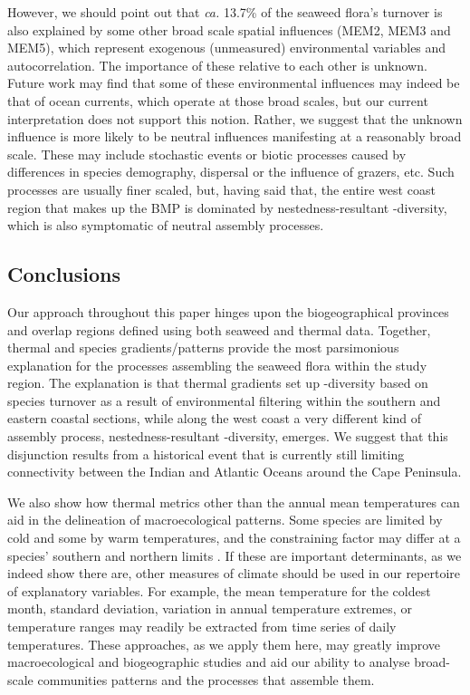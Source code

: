 \documentclass[utf8]{frontiersSCNS} %
\begin{document}
However, we should point out that \emph{ca.} 13.7\% of the seaweed flora's turnover is also explained by some other broad scale spatial influences (MEM2, MEM3 and MEM5), which represent exogenous (unmeasured) environmental variables and autocorrelation. The importance of these relative to each other is unknown. Future work may find that some of these environmental influences may indeed be that of ocean currents, which operate at those broad scales, but our current interpretation does not support this notion. Rather, we suggest that the unknown influence is more likely to be neutral influences \citep{Hubbell2001} manifesting at a reasonably broad scale. These may include stochastic events \citep[\emph{e.g.}][]{Smale2011} or biotic processes caused by differences in species demography, dispersal or the influence of grazers, etc. Such processes are usually finer scaled, but, having said that, the entire west coast region that makes up the BMP is dominated by nestedness-resultant \textbeta-diversity, which is also symptomatic of neutral assembly processes.

\subsection{Conclusions}

Our approach throughout this paper hinges upon the biogeographical provinces and overlap regions defined using both seaweed and thermal data. Together, thermal and species gradients/patterns provide the most parsimonious explanation for the processes assembling the seaweed flora within the study region. The explanation is that thermal gradients set up \textbeta-diversity based on species turnover as a result of environmental filtering within the southern and eastern coastal sections, while along the west coast a very different kind of assembly process, nestedness-resultant \textbeta-diversity, emerges. We suggest that this disjunction results from a historical event that is currently still limiting connectivity between the Indian and Atlantic Oceans around the Cape Peninsula.

We also show how thermal metrics other than the annual mean temperatures can aid in the delineation of macroecological patterns. Some species are limited by cold and some by warm temperatures, and the constraining factor may differ at a species' southern and northern limits \citep[\emph{e.g.}][]{VandenHoek1982a,Breeman1988}. If these are important determinants, as we indeed show there are, other measures of climate should be used in our repertoire of explanatory variables. For example, the mean temperature for the coldest month, standard deviation, variation in annual temperature extremes, or temperature ranges \citep[\emph{e.g.} as used by][]{Qian2007,Leaper2011} may readily be extracted from time series of daily temperatures. These approaches, as we apply them here, may greatly improve macroecological and biogeographic studies and aid our ability to analyse broad-scale communities patterns and the processes that assemble them.
\end{document}
